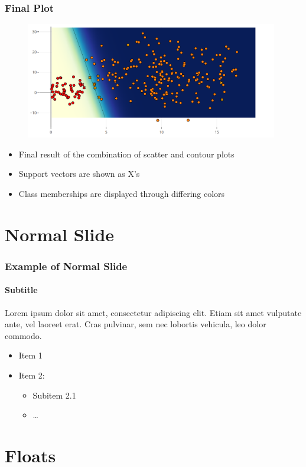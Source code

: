 \documentclass[english,hangout]{beamer}
\begin{document}
\begin{frame}
	\frametitle{Final Plot}
	\begin{figure}
		\centering
		\includegraphics[width=11cm]{FinalPlot.png}
	\end{figure}
	\begin{itemize}
		\item Final result of the combination of scatter and contour plots
		\item Support vectors are shown as X's
		\item Class memberships are displayed through differing colors
	\end{itemize}
\end{frame}





\section{Normal Slide}

\begin{frame}[fragile]
 \frametitle{Example of Normal Slide}
 \framesubtitle{Subtitle}
 Lorem ipsum dolor sit amet, consectetur adipiscing elit. Etiam sit amet
 vulputate ante, vel laoreet erat. Cras pulvinar, sem nec lobortis vehicula,
 leo dolor commodo.
 
  \begin{itemize}
   \item Item 1
   \item Item 2:
     \begin{itemize}
      \item Subitem 2.1
      \item\dots
     \end{itemize}
  \end{itemize}
\end{frame}



\section{Floats}
\end{document}
